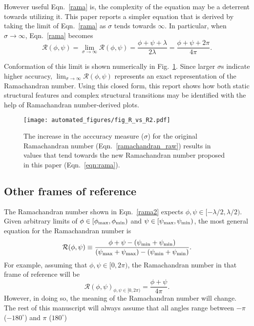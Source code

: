 \documentclass[fleqn,10pt,lineno]{wlpeerj} %
\newcommand{\Fig}[1]{Fig.~\ref{#1}}
\newcommand{\Eqn}[1]{Eqn.~\ref{#1}}
\begin{document}
However useful \Eqn{rama} is, the complexity of the equation may be a deterrent towards utilizing it. This paper reports a simpler equation that is derived by taking the limit of \Eqn{rama} as $\sigma$ tends towards $\infty$. In particular, when $\sigma\to\infty$, \Eqn{rama} becomes
\begin{equation}
\mathcal{R}(\phi,\psi) = \lim_{\sigma\to\infty}{\mathcal{R}}(\phi,\psi) = \frac{\phi+\psi+\lambda}{2\lambda} =
\frac{\phi+\psi+2\pi}{4\pi}.
\label{rama2}
\end{equation}

Conformation of this limit is shown numerically in \Fig{fig:sigma}. Since larger $\sigma$s indicate higher accuracy, $\displaystyle\lim_{\sigma\to\infty}{\mathcal{R}}(\phi,\psi)$ represents an exact representation of the Ramachandran number. Using this closed form, this report shows how both static structural features and complex structural transitions may be identified with the help of Ramachandran number-derived plots.

\begin{figure}[t!]
\centering
\texttt{[image: automated\_figures/fig\_R\_vs\_R2.pdf]}
\caption{The increase in the acccuracy measure ($\sigma$) for the original Ramachandran number (\Eqn{ramachandran_raw}) results in values that tend towards the new Ramachandran number proposed in this paper (\Eqn{eqn:rama}).\label{fig:sigma}} 
\end{figure}

\subsection{Other frames of reference}
The Ramachandran number shown in \Eqn{rama2} expects $\phi,\psi \in [-\lambda/2,\lambda/2)$. Given arbitrary limits of $\phi \in [\phi_{\rm max},\phi_{\rm min})$ and $\psi \in [\psi_{\rm max},\psi_{\rm min})$, the most general equation for the Ramachandran number is
\begin{equation}
{\mathcal{R}}(\phi,\psi) \equiv  \frac{\phi+\psi-(\psi_{\rm min}+\psi_{\rm min})}{(\psi_{\rm max}+\psi_{\rm max})-(\psi_{\rm min}+\psi_{\rm min})}.
\label{ramaGeneral}
\end{equation}
For example, assuming that $\phi,\psi \in [0,2\pi)$, the Ramachandran number in that frame of reference will be
\begin{equation}
{\mathcal{R}}(\phi,\psi)_{\phi,\psi \in [0,2\pi)} = \frac{\phi+\psi}{4\pi}.
\label{ramaGeneral}
\end{equation}
However, in doing so, the meaning of the Ramachandran number will change. The rest of this manuscript will always assume that all angles range between $-\pi$ ($-180^\circ$) and $\pi$ ($180^\circ$)
\end{document}
